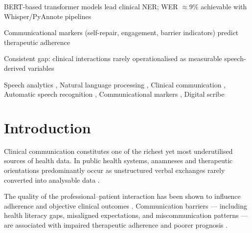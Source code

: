 \documentclass[a4paper,fleqn]{cas-sc}
\begin{document}
\begin{highlights}
\item BERT-based transformer models lead clinical NER; WER $\approx$9\%
      achievable with Whisper/PyAnnote pipelines
\item Communicational markers (self-repair, engagement, barrier indicators)
      predict therapeutic adherence
\item Consistent gap: clinical interactions rarely operationalised as
      measurable speech-derived variables
\end{highlights}

\begin{keywords}
Speech analytics \sep
Natural language processing \sep
Clinical communication \sep
Automatic speech recognition \sep
Communicational markers \sep
Digital scribe
\end{keywords}

\maketitle

\section{Introduction}
\label{sec:intro}

Clinical communication constitutes one of the richest yet most underutilised
sources of health data. In public health systems, anamneses and therapeutic
orientations predominantly occur as unstructured verbal exchanges rarely
converted into analysable data \citep{Wang2018,Koleck2019}.

The quality of the professional–patient interaction has been shown to
influence adherence and objective clinical outcomes \citep{Kelley2014}.
Communication barriers — including health literacy gaps, misaligned
expectations, and miscommunication patterns — are associated with impaired
therapeutic adherence and poorer prognosis
\citep{McCabe2018,Alkhamees2023}.
\end{document}
